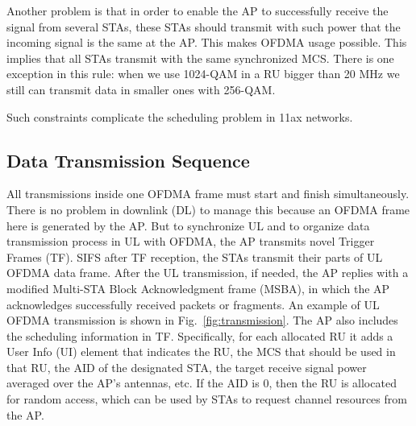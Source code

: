 Another problem is that in order to enable the AP to successfully receive the signal from several STAs, these STAs should transmit with such power that the incoming signal is the same at the AP.
This makes OFDMA usage possible. 
This implies that all STAs transmit with the same synchronized MCS. 
There is one exception in this rule: when we use 1024-QAM in a RU bigger than 20 MHz we still can transmit data in smaller ones with 256-QAM. 

Such constraints complicate the scheduling problem in 11ax networks.

\subsection{Data Transmission Sequence}

All transmissions inside one OFDMA frame must start and finish simultaneously. 
There is no problem in downlink (DL) to manage this because an OFDMA frame here is generated by the AP. 
But to synchronize UL and to organize data transmission process in UL with OFDMA, the AP transmits novel Trigger Frames (TF).
SIFS after TF reception, the STAs transmit their parts of UL OFDMA data frame. 
After the UL transmission, if needed, the AP replies with a modified Multi-STA
Block Acknowledgment frame (MSBA), in which the AP acknowledges successfully received packets or fragments.
An example of UL OFDMA transmission is shown in Fig.~\ref{fig:transmission}.
The AP also includes the scheduling information in TF.
Specifically, for each allocated RU it adds a User Info (UI) element that indicates the RU, the MCS that should be used in that RU, the AID of the designated STA, the target receive signal power averaged over the AP's antennas, etc. 
If the AID is $0$, then the RU is allocated for random access, which can be used by STAs to request channel resources from the AP.

